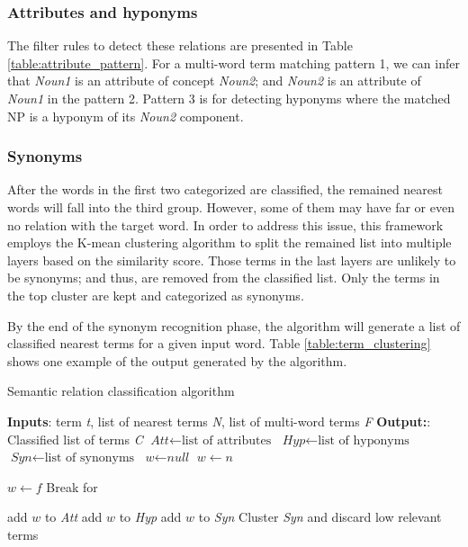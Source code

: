 \documentclass[Journal, BackFigs,NoLists, DoubleSpace]{ascelike}%
\begin{document}
\subsubsection{Attributes and hyponyms}
The filter rules to detect these relations are presented in Table \ref{table:attribute_pattern}. For a multi-word term matching pattern 1, we can infer that \textit{Noun1} is an attribute of concept \textit{Noun2}; and \textit{Noun2} is an attribute of \textit{Noun1} in the pattern 2. Pattern 3 is for detecting hyponyms where the matched NP is a hyponym of its \textit{Noun2} component.  
\subsubsection{Synonyms}
After the words in the first two categorized are classified, the remained nearest words will fall into the third group. However, some of them may have far or even no relation with the target word. In order to address this issue, this framework employs the K-mean clustering algorithm \cite{macqueen67} to split the remained list into multiple layers based on the similarity score. Those terms in the last layers are unlikely to be synonyms; and thus, are removed from the classified list. Only the terms in the top cluster are kept and categorized as synonyms. 
\par
By the end of the synonym recognition phase, the algorithm will generate a list of classified nearest terms for a given input word. Table \ref{table:term_clustering} shows one example of the output generated by the algorithm. 
%
\begin{algorithm}[h]
	
	\caption{Semantic relation classification algorithm}\label{alg:term_class}
	\begin{algorithmic}[1]
		\State \textbf{Inputs}: term \textit{t}, list of nearest terms \textit{N}, list of multi-word terms \textit{F}
		\State \textbf{Output:}: Classified list of terms \textit{C}
		\State $\textit{Att} \gets \text{list of attributes}$
		\State $\textit{Hyp} \gets \text{list of hyponyms}$
		\State $\textit{Syn} \gets \text{list of synonyms}$
		\State $\textit{w} \gets \textit{null}$
		\State $w \gets n$
		
		\Else
		\State $w \gets f$	
		\State Break for
		
		\EndIf
		\EndFor
		\EndIf
		
		\State add $w$ to \textit{Att}
		\State add $w$ to \textit{Hyp}
		\Else
		\State add $w$ to \textit{Syn}
		\EndIf
		\EndFor
		\State Cluster \textit{Syn} and discard low relevant terms
		
		\EndProcedure
	\end{algorithmic}
\end{algorithm}
\end{document}

